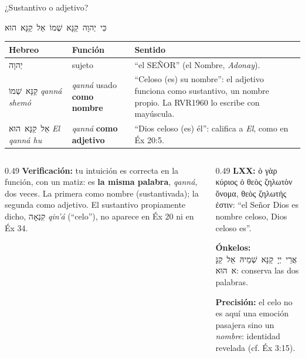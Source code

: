 \documentclass[hyperref={bookmarks=false},aspectratio=169]{beamer}
\newcommand{\heb}[1]{\mbox{\foreignlanguage{hebrew}{#1}}}
\newcommand{\grc}[1]{\foreignlanguage{ancientgreek}{#1}}
\newcommand{\SENOR}{S{\fontsize{0.78em}{1em}\selectfont EÑOR}}
\newcommand{\destacar}[1]{\textbf{\textcolor{azul}{#1}}}
\newcommand{\precision}[1]{{\footnotesize\color{gris}\textbf{Precisión:} #1}}
\begin{document}
\begin{frame}{¿Sustantivo o adjetivo?}
\begin{center}\large\heb{כִּי יְהוָה קַנָּא שְׁמוֹ אֵל קַנָּא הוּא}\end{center}
\scriptsize\renewcommand{\arraystretch}{1.15}
\begin{tabular}{@{}>{\RaggedRight\arraybackslash}p{2.0cm}>{\RaggedRight\arraybackslash}p{2.6cm}>{\RaggedRight\arraybackslash}p{7.2cm}@{}}
\toprule
\textbf{Hebreo} & \textbf{Función} & \textbf{Sentido} \\ \midrule
\heb{יְהוָה} & sujeto & ``el \SENOR'' (el Nombre, \emph{Adonay}). \\
\heb{קַנָּא שְׁמוֹ} \emph{qanná shemó} & \emph{qanná} usado \destacar{como nombre} & ``Celoso (es) su nombre'': el adjetivo funciona como sustantivo, un nombre propio. La RVR1960 lo escribe con mayúscula. \\
\heb{אֵל קַנָּא הוּא} \emph{El qanná hu} & \emph{qanná} \destacar{como adjetivo} & ``Dios celoso (es) él'': califica a \emph{El}, como en Éx 20:5. \\
\bottomrule
\end{tabular}\par\medskip
\begin{columns}[t,onlytextwidth]
\begin{column}{0.49\textwidth}\small
\textbf{Verificación:} tu intuición es correcta en la función, con un matiz: es \destacar{la misma palabra}, \emph{qanná}, dos veces. La primera como nombre (sustantivada); la segunda como adjetivo. El sustantivo propiamente dicho, \heb{קִנְאָה} \emph{qin'á} (``celo''), no aparece en Éx 20 ni en Éx 34.
\end{column}
\begin{column}{0.49\textwidth}\scriptsize
\textbf{LXX:} \grc{ὁ γὰρ κύριος ὁ θεὸς ζηλωτὸν ὄνομα, θεὸς ζηλωτής ἐστιν}: ``el Señor Dios es nombre celoso, Dios celoso es''.\par\smallskip
\textbf{Ónkelos:} \heb{אֲרֵי יְיָ קַנָּא שְׁמֵיהּ אֵל קַנָּא הוּא}: conserva las dos palabras.\par\smallskip
\precision{el celo no es aquí una emoción pasajera sino un \emph{nombre}: identidad revelada (cf. Éx 3:15).}
\end{column}
\end{columns}
\end{frame}
\end{document}
